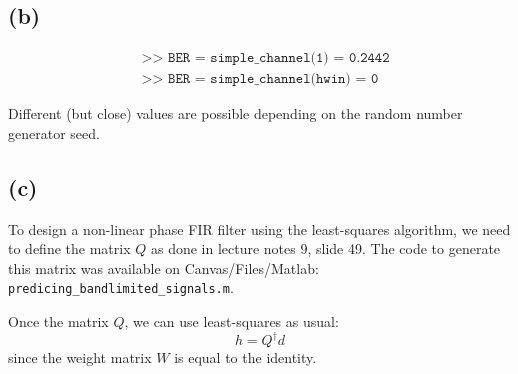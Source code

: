 \documentclass{article}
\begin{document}
\subsection{(b)}

\begin{align}
	&\texttt{>> BER = simple\_channel(1) = 0.2442} \tag{without equalization} \\
	&\texttt{>> BER = simple\_channel(hwin) = 0} \tag{with equalization}
\end{align}

Different (but close) values are possible depending on the random number generator seed.

\subsection{(c)}

To design a non-linear phase FIR filter using the least-squares algorithm, we need to define the matrix $Q$ as done in lecture notes 9, slide 49. The code to generate this matrix was available on Canvas/Files/Matlab: \texttt{predicing\_bandlimited\_signals.m}.

Once the matrix $Q$, we can use least-squares as usual:
\begin{equation}
h = Q^\dagger d
\end{equation}
since the weight matrix $W$ is equal to the identity.
\end{document}
